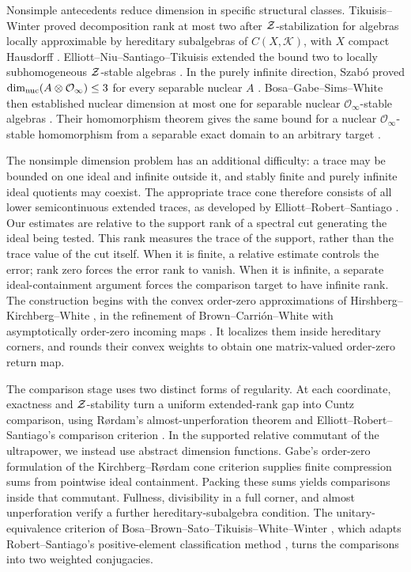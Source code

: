 Nonsimple antecedents reduce dimension in specific structural
classes. Tikuisis--Winter proved decomposition rank at most two after
$\mathcal Z$-stabilization for algebras locally approximable by hereditary
subalgebras of $C(X,\mathcal K)$, with $X$ compact Hausdorff
\cite[Theorem~4.1]{TiW}.
Elliott--Niu--Santiago--Tikuisis extended the bound two to locally
subhomogeneous $\mathcal Z$-stable algebras \cite[Theorem~A]{ENST}.
In the purely infinite direction, Szab\'o proved
$\dim_{\mathrm{nuc}}(A\otimes\mathcal O_\infty)\le3$ for every separable nuclear
$A$ \cite[Theorem~2.3]{SzaboOInfinity}. Bosa--Gabe--Sims--White
then established nuclear dimension at most one for separable nuclear
$\mathcal O_\infty$-stable algebras \cite[Theorem~A]{BGSW}.
Their homomorphism theorem gives the same bound for a nuclear
$\mathcal O_\infty$-stable homomorphism from a separable exact domain
to an arbitrary target \cite[Theorem~C]{BGSW}.

The nonsimple dimension problem has an additional difficulty: a trace
may be bounded on one ideal and infinite outside it, and stably finite
and purely infinite ideal quotients may coexist. The appropriate trace
cone therefore consists of all lower semicontinuous extended traces,
as developed by Elliott--Robert--Santiago \cite{ERS}. Our estimates are
relative to the support rank of a spectral cut generating the ideal
being tested. This rank measures the trace of the support, rather than
the trace value of the cut itself. When it is finite, a relative estimate
controls the error; rank zero forces the error rank to vanish. When it
is infinite, a separate ideal-containment argument forces the comparison
target to have infinite rank. The construction begins with the convex order-zero approximations of
Hirshberg--Kirchberg--White \cite{HKW}, in the refinement of
Brown--Carri\'on--White with asymptotically order-zero incoming maps
\cite{BCW}. It localizes them inside hereditary
corners, and rounds their convex weights to obtain one matrix-valued
order-zero return map.

The comparison stage uses two distinct forms of regularity. At each
coordinate, exactness and $\mathcal Z$-stability turn a uniform extended-rank
gap into Cuntz comparison, using R\o rdam's almost-unperforation theorem
\cite{Rordam} and Elliott--Robert--Santiago's comparison criterion
\cite[Proposition~6.2]{ERS}. In the supported relative commutant of the ultrapower,
we instead use abstract dimension functions. Gabe's order-zero
formulation \cite{Gabe} of the Kirchberg--R\o rdam cone criterion
\cite{KR05} supplies finite compression
sums from pointwise ideal containment. Packing these sums yields comparisons
inside that commutant. Fullness, divisibility in a full corner, and
almost unperforation verify a further hereditary-subalgebra condition.
The unitary-equivalence criterion of
Bosa--Brown--Sato--Tikuisis--White--Winter \cite{BBSTWW}, which adapts
Robert--Santiago's positive-element classification method \cite{RS},
turns the comparisons into two weighted conjugacies.

